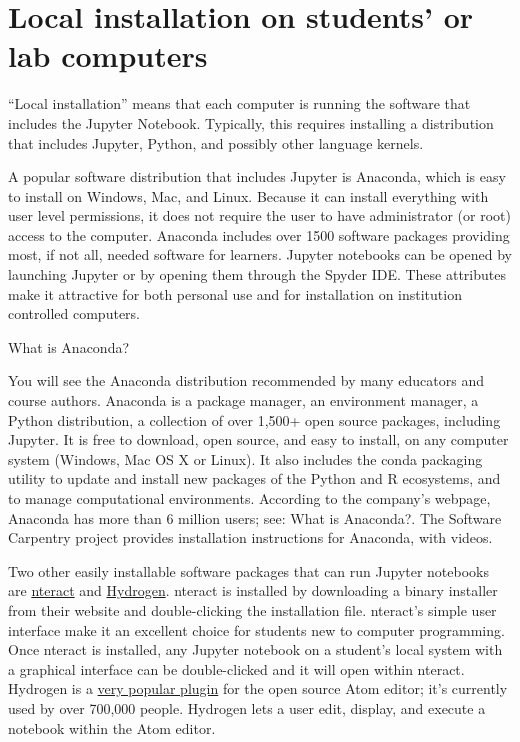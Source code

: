 \documentclass[]{book}
\let\BeginKnitrBlock\begin \let\EndKnitrBlock\end
\begin{document}
\hypertarget{local-installation-on-students-or-lab-computers}{%
\section{Local installation on students' or lab computers}\label{local-installation-on-students-or-lab-computers}}

``Local installation'' means that each computer is running the software
that includes the Jupyter Notebook. Typically, this requires
installing a distribution that includes Jupyter, Python, and possibly
other language kernels.

A popular software distribution that includes Jupyter is Anaconda, which is
easy to install on Windows, Mac, and Linux. Because it can install everything
with user level permissions, it does not require the user to have administrator
(or root) access to the computer. Anaconda includes over 1500 software packages
providing most, if not all, needed software for learners. Jupyter notebooks can
be opened by launching Jupyter or by opening them through the Spyder IDE. These
attributes make it attractive for both personal use and for installation on
institution controlled computers.

\BeginKnitrBlock{rmdnote}
What is Anaconda?

You will see the Anaconda distribution
recommended by many educators and course authors. Anaconda is a
package manager, an environment manager, a Python distribution, a
collection of over 1,500+ open source
packages,
including Jupyter. It is free to download, open source, and easy to
install, on any computer system (Windows, Mac OS X or Linux). It
also includes the conda packaging utility to update and install
new packages of the Python and R ecosystems, and to manage
computational environments. According to the company's webpage,
Anaconda has more than 6 million
users; see: What is Anaconda?.
The Software Carpentry project provides installation
instructions for Anaconda, with videos.
\EndKnitrBlock{rmdnote}

Two other easily installable software packages that can run Jupyter notebooks
are \href{https://nteract.io/}{nteract} and \href{https://nteract.io/atom}{Hydrogen}.
nteract is installed by downloading a binary installer from their website and
double-clicking the installation file. nteract's simple user interface make it
an excellent choice for students new to computer programming. Once nteract is
installed, any Jupyter notebook on a student's local system with a graphical interface can be
double-clicked and it will open within nteract. Hydrogen is a \href{https://atom.io/packages/hydrogen}{very popular
plugin} for the open source Atom editor;
it's currently used by over 700,000 people. Hydrogen lets a user edit, display,
and execute a notebook within the Atom editor.
\end{document}
